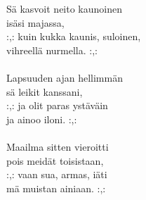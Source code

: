 
        Sä kasvoit neito kaunoinen \\
        isäsi majassa, \\
        :,: kuin kukka kaunis, suloinen, \\
        vihreellä nurmella. :,: \\
\hspace{10mm} \\
        Lapsuuden ajan hellimmän \\
        sä leikit kanssani, \\
        :,: ja olit paras ystäväin \\
        ja ainoo iloni. :,: \\
\hspace{10mm} \\
        Maailma sitten vieroitti \\
        pois meidät toisistaan, \\
        :,: vaan sua, armas, iäti \\
        mä muistan ainiaan. :,: \\
